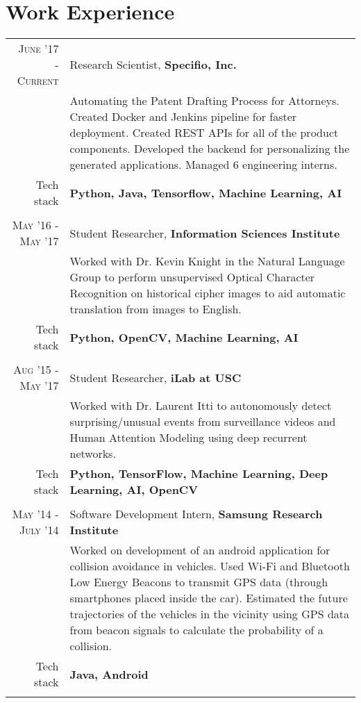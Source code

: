 \section{Work Experience}
\renewcommand{\arraystretch}{0.85}%
\begin{tabular}{r|p{13cm}}
\textsc{June '17 - Current} & Research Scientist, \textbf{Specifio, Inc.} \\
& \small{Automating the Patent Drafting Process for Attorneys. Created Docker and Jenkins pipeline for faster deployment. Created REST APIs for all of the product components. Developed the backend for personalizing the generated applications. Managed 6 engineering interns.}\\
\small{Tech stack} &\footnotesize{\textbf{Python, Java, Tensorflow, Machine Learning, AI}} \\
\multicolumn{2}{c}{} \\

\textsc{May '16 - May '17} & Student Researcher, \textbf{Information Sciences Institute} \\
& \small{Worked with Dr. Kevin Knight in the Natural Language Group to perform unsupervised Optical Character Recognition on historical cipher images to aid automatic translation from images to English.}\\
\small{Tech stack} &\footnotesize{\textbf{Python, OpenCV, Machine Learning, AI}} \\
\multicolumn{1}{c}{} \\

\textsc{Aug '15 - May '17} & Student Researcher, \textbf{iLab at USC} \\
& \small{Worked with Dr. Laurent Itti to autonomously detect surprising/unusual events from surveillance videos and Human Attention Modeling using deep recurrent networks.}\\
\small{Tech stack} &\footnotesize{\textbf{Python, TensorFlow, Machine Learning, Deep Learning, AI, OpenCV}} \\
\multicolumn{1}{c}{} \\

\textsc{May '14 - July '14 } & Software Development Intern, \textbf{Samsung Research Institute} \\
& \small{Worked on development of an android application for collision avoidance in vehicles. Used Wi-Fi and Bluetooth Low Energy Beacons to transmit GPS data (through smartphones placed inside the car). Estimated the future trajectories of the vehicles in the vicinity using GPS data from beacon signals to calculate the probability of a collision.}\\
\small{Tech stack} &\footnotesize{\textbf{Java, Android}} \\
\multicolumn{2}{c}{}


\end{tabular}

